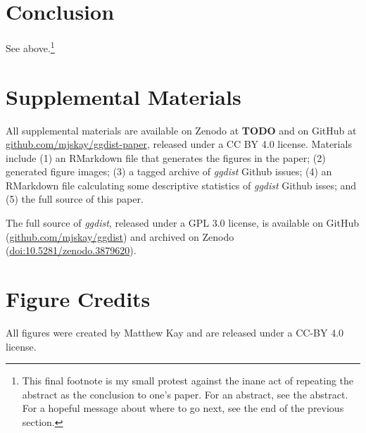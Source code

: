 \documentclass[journal]{vgtc}                     %
\begin{document}
\section{Conclusion}

See above.\footnote{This final footnote is my small protest against the inane act of repeating the abstract as the conclusion to one's paper. For an abstract, see the abstract. For a hopeful message about where to go next, see the end of the previous section.}

\section*{Supplemental Materials}
\label{sec:supplemental_materials}

All supplemental materials are available on Zenodo at \textbf{TODO} and on GitHub at \href{https://github.com/mjskay/ggdist-paper}{github.com/mjskay/ggdist-paper}, released under a CC BY 4.0 license.
Materials include (1) an RMarkdown file that generates the figures in the paper; (2) generated figure images; (3) a tagged archive of \textit{ggdist} Github issues; (4) an RMarkdown file calculating some descriptive statistics of \textit{ggdist} Github isses; and (5) the full source of this paper.

The full source of \textit{ggdist}, released under a GPL 3.0 license, is available on GitHub (\href{https://github.com/mjskay/ggdist}{github.com/mjskay/ggdist}) and archived on Zenodo (\href{https://doi.org/10.5281/zenodo.3879620}{doi:10.5281/zenodo.3879620}).

\section*{Figure Credits}
\label{sec:figure_credits}

All figures were created by Matthew Kay and are released under a CC-BY 4.0 license.




%
%
%





\appendix %
\end{document}
